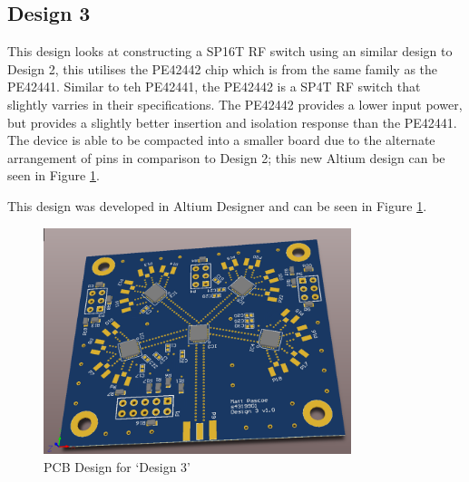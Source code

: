 \documentclass[12pt,openany,a4paper]{book}
\begin{document}
\subsection{Design 3}		\label{sec:design3}
This design looks at constructing a SP16T RF switch using an similar design to Design 2, this utilises the PE42442 chip which is from the same family as the PE42441. Similar to teh PE42441, the PE42442 is a SP4T RF switch that slightly varries in their specifications. The PE42442 provides a lower input power, but provides a slightly better insertion and isolation response than the PE42441.\\[0.2cm]

The device is able to be compacted into a smaller board due to the alternate arrangement of pins in comparison to Design 2; this new Altium design can be seen in Figure \ref{fig:design3}.

This design was developed in Altium Designer and can be seen in Figure \ref{fig:design3}.
\begin{figure}[H]
	\centering
    \includegraphics[width=0.8\textwidth]{design3_pcb.png}
	\caption{PCB Design for `Design 3'}
	\label{fig:design3}
\end{figure} 
\end{document}
